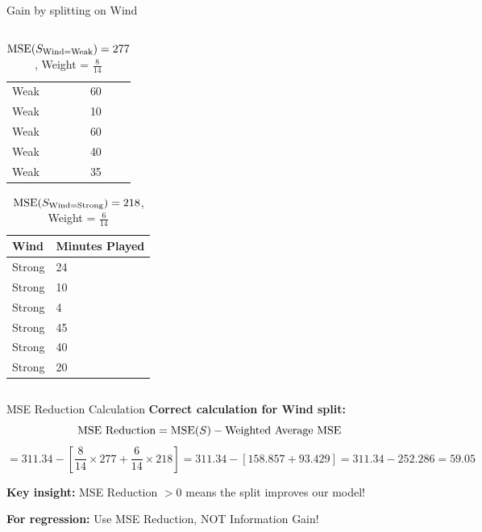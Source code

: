 \documentclass[usenames,dvipsnames]{beamer}
\begin{document}
\begin{frame}{Gain by splitting on Wind}
\begin{columns}
\begin{column}{.5\textwidth}
\begin{tiny}
\begin{table}[]
\begin{tabular}{@{}ll@{}}
		Weak          & 60                      \\
		Weak          & 10                      \\
		Weak          & 60                      \\
		Weak          & 40                      \\
		Weak          & 35                      \\ \bottomrule
	\end{tabular}
\caption{$\operatorname{MSE}(S_{\text{Wind=Weak}}) = 277$, Weight = $\frac{8}{14}$}
\end{table}
\vspace{-25pt}
	\end{tiny}

	\begin{tiny}
	
	\begin{table}[]
		\begin{tabular}{@{}ll@{}}
			\toprule
			\textbf{Wind} & \textbf{Minutes Played} \\ \midrule

			Strong        & 24                      \\
			Strong        & 10                      \\
			Strong        & 4                       \\
			Strong        & 45                      \\
			Strong        & 40                      \\
			Strong        & 20                      \\ \bottomrule
		\end{tabular}
\caption{$\operatorname{MSE}(S_{\text{Wind=Strong}}) = 218$, Weight = $\frac{6}{14}$}
	\end{table}
\end{tiny}

\end{column}
\end{columns}
\end{frame}

\begin{frame}{MSE Reduction Calculation}
\textbf{Correct calculation for Wind split:}
\[
\text{MSE Reduction} = \operatorname{MSE}(S) - \text{Weighted Average MSE}
\]
\[
= 311.34 - \left[\frac{8}{14} \times 277 + \frac{6}{14} \times 218\right] = 311.34 - [158.857 + 93.429] = 311.34 - 252.286 = \mathbf{59.05}
\]

\textbf{Key insight:} MSE Reduction $> 0$ means the split improves our model!

\textbf{For regression:} Use MSE Reduction, NOT Information Gain!
\end{frame}
\end{document}
